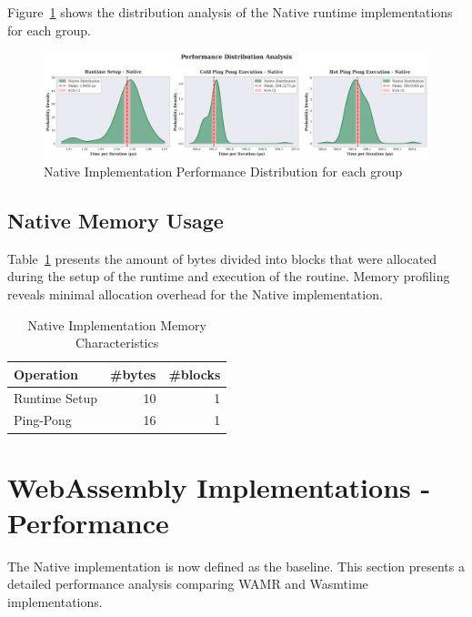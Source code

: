 Figure~\ref{fig:native-distributions} shows the distribution analysis of the Native runtime implementations for each group.
\begin{figure}[h]
    \centering
    \includegraphics[width=\textwidth]{images/native-distributions}
    \caption{Native Implementation Performance Distribution for each group}
    \label{fig:native-distributions}
\end{figure}

\subsection{Native Memory Usage}
\label{subsec:native-memory}

Table~\ref{tab:native-memory} presents the amount of bytes divided into blocks that were allocated during the setup of the runtime and execution of the routine. Memory profiling reveals minimal allocation overhead for the Native implementation.

\begin{table}[h]
    \centering
    \caption{Native Implementation Memory Characteristics}
    \label{tab:native-memory}
    \begin{tabular}{lrr}
        \toprule
        \textbf{Operation} & \textbf{\#bytes} & \textbf{\#blocks} \\
        \midrule
        Runtime Setup & 10 & 1 \\
        Ping-Pong & 16 & 1 \\
        \bottomrule
    \end{tabular}
\end{table}


\section{WebAssembly Implementations - Performance}
\label{sec:wasm-performance}

The Native implementation is now defined as the baseline. This section presents a detailed performance analysis comparing WAMR and Wasmtime implementations.

